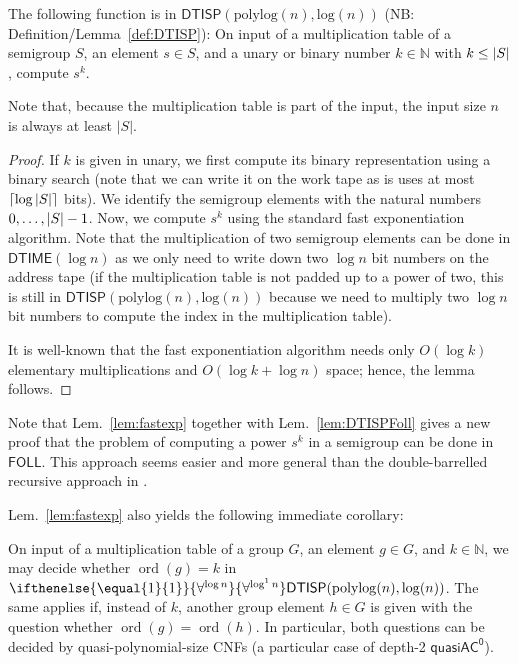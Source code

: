 \documentclass{article}
\newcommand{\ord}[1]{\operatorname{ord}(#1)}
\newcommand{\alphacc}[1]{\ifthenelse{\equal{#1}{1}}{\forall^{\log n}}{\forall^{\log^{#1}n}}} %
\newcommand{\Oh}{O}
\newcommand{\N}{\mathbb{N}}
\newcommand{\abs}[1]{\left|\mathinner{#1}\right|}
\newcommand{\ceil}[1]{\left\lceil\mathinner{#1}\right\rceil}
\newcommand{\Lem}[1]{Lem.~\ref{#1}\xspace}
\newcommand*{\ComplexityClass}[1]{\ensuremath{\mathsf{#1}}\xspace}
\newcommand{\DTISP}{\ComplexityClass{DTISP}}
\newcommand{\DTISPpll}{\ensuremath{\DTISP(\mathrm{polylog}(n),\mathrm{log}(n))}\xspace}
\newcommand{\qACz}{\ComplexityClass{quasiAC^0}}
\newcommand{\FOLL}{\ComplexityClass{FOLL}}
\newcommand{\DTIME}{\ComplexityClass{DTIME}}
\begin{document}
\begin{lemma}\label{lem:fastexp}
    The following function is in $\DTISPpll$ (NB: Definition/Lemma~\ref{def:DTISP}):
    On input of a multiplication table of a semigroup $S$, an element $s \in S$, and a unary or binary number $k \in \N$ with $k \leq \abs{S}$, compute $s^k$. 
\end{lemma}

Note that, because the multiplication table is part of the input, the input size $n$ is always at least $|S|$.

\begin{proof}
    If $k$ is given in unary, we first compute its binary representation using a binary search (note that we can write it on the work tape as is uses at most $\ceil{\log\abs{S}}$ bits). We identify the semigroup elements with the natural numbers $0, \dots, \abs{S}-1$.
    Now, we compute $s^k$ using the standard fast exponentiation algorithm. Note that the multiplication of two semigroup elements can be done in $\DTIME(\log n)$ as we only need to write down two $\log n$ bit numbers on the address tape (if the multiplication table is not padded up to a power of two, this is still in $\DTISPpll$ because we need to multiply two $\log n$ bit numbers to compute the index in the multiplication table). 

    It is well-known that the fast exponentiation algorithm needs only $\Oh(\log k)$ elementary multiplications and $O(\log k + \log n)$ space; hence, the lemma follows.
\end{proof}


Note that \Lem{lem:fastexp} together with \Lem{lem:DTISPFoll} gives a new proof that the problem of computing a power $s^k$ in a semigroup can be done in \FOLL. This approach seems easier and more general than the double-barrelled recursive approach in \cite{BKLM}.

\Lem{lem:fastexp} also yields the following immediate corollary:

\begin{corollary} \label{cor:fastexp}\label{lem:order_finding}
On input of a multiplication table of a group $G$, an element $g \in G$, and $k \in \N$, we may decide whether  $\ord{g} = k$ in $\alphacc{1}\DTISPpll$. The same applies if, instead of $k$, another group element $h\in G$ is given with the question whether $\ord{g} = \ord{h}$. In particular, both questions can be decided by quasi-polynomial-size CNFs (a particular case of depth-2 $\qACz$).
\end{corollary}
\end{document}
